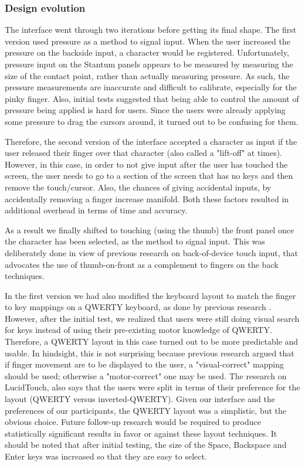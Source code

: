 \subsubsection{Design evolution}

The interface went through two iterations before getting its final shape. The first version used pressure as a method to signal input. When the user increased the pressure on the backside input, a character would be registered.  Unfortunately, pressure input on the Stantum panels appears to be measured by measuring the size of the contact point, rather than actually measuring pressure.  As such, the pressure measurements are inaccurate and difficult to calibrate, especially for the pinky finger. Also, initial tests suggested that being able to control the amount of pressure being applied is hard for users. Since the users were already applying some pressure to drag the cursors around, it turned out to be confusing for them.

Therefore, the second version of the interface accepted a character as input if the user released their finger over that character (also called a "lift-off" at times). However, in this case, in order to not give input after the user has touched the screen, the user needs to go to a section of the screen that has no keys and then remove the touch/cursor. Also, the chances of giving accidental inputs, by accidentally removing a finger increase manifold. Both these factors resulted in additional overhead in terms of time and accuracy.

As a result we finally shifted to touching (using the thumb) the front panel once the character has been selected, as the method to signal input. This was deliberately done in view of previous research on back-of-device touch input, that advocates the use of thumb-on-front as a complement to fingers on the back techniques.  

In the first version we had also modified the keyboard layout to match the finger to key mappings on a QWERTY keyboard, as done by previous research . However, after the initial test, we realized that users were still doing visual search for keys instead of using their pre-existing motor knowledge of QWERTY. Therefore, a QWERTY layout in this case turned out to be more predictable and usable. In hindsight, this is not surprising because previous research  argued that if finger movement are to be displayed to the user, a "visual-correct" mapping should be used; otherwise a "motor-correct" one may be used. The research on LucidTouch, also says that the users were split in terms of their preference for the layout (QWERTY versus inverted-QWERTY). Given our interface and the preferences of our participants, the QWERTY layout was a simplistic, but the obvious choice. Future follow-up research would be required to produce statistically significant results in favor or against these layout techniques. It should be noted that after initial testing, the size of the Space, Backspace and Enter keys was increased so that they are easy to select.

